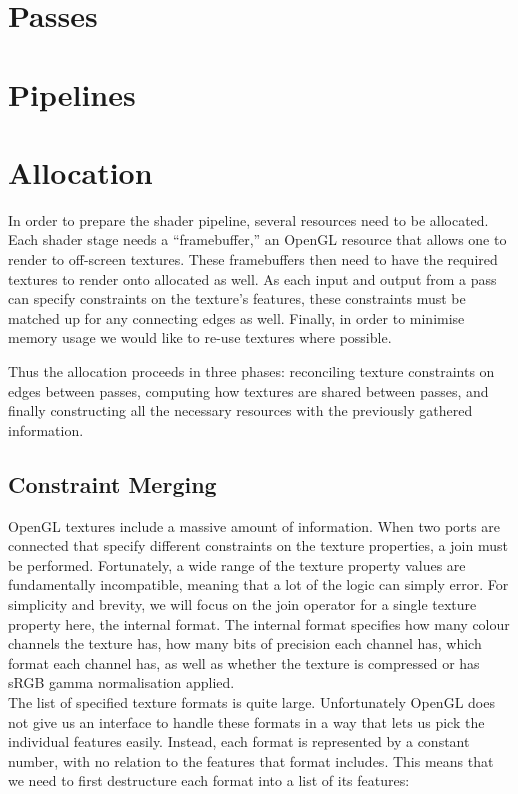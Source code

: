 \documentclass[format=sigconf]{acmart}
\begin{document}
\section{Passes}\label{passes}

\section{Pipelines}\label{pipelines}

\section{Allocation}\label{allocation}
In order to prepare the shader pipeline, several resources need to be allocated. Each shader stage needs a ``framebuffer,'' an OpenGL resource that allows one to render to off-screen textures. These framebuffers then need to have the required textures to render onto allocated as well. As each input and output from a pass can specify constraints on the texture's features, these constraints must be matched up for any connecting edges as well. Finally, in order to minimise memory usage we would like to re-use textures where possible.

Thus the allocation proceeds in three phases: reconciling texture constraints on edges between passes, computing how textures are shared between passes, and finally constructing all the necessary resources with the previously gathered information.

\subsection{Constraint Merging}\label{texture-constraints}
OpenGL textures include a massive amount of information.\cite{texparameter}\cite{teximage2d} When two ports are connected that specify different constraints on the texture properties, a join must be performed. Fortunately, a wide range of the texture property values are fundamentally incompatible, meaning that a lot of the logic can simply error. For simplicity and brevity, we will focus on the join operator for a single texture property here, the internal format. The internal format specifies how many colour channels the texture has, how many bits of precision each channel has, which format each channel has, as well as whether the texture is compressed or has sRGB gamma normalisation applied. \\

The list of specified texture formats is quite large.\cite{texinternalformat} Unfortunately OpenGL does not give us an interface to handle these formats in a way that lets us pick the individual features easily. Instead, each format is represented by a constant number, with no relation to the features that format includes. This means that we need to first destructure each format into a list of its features:
\end{document}

